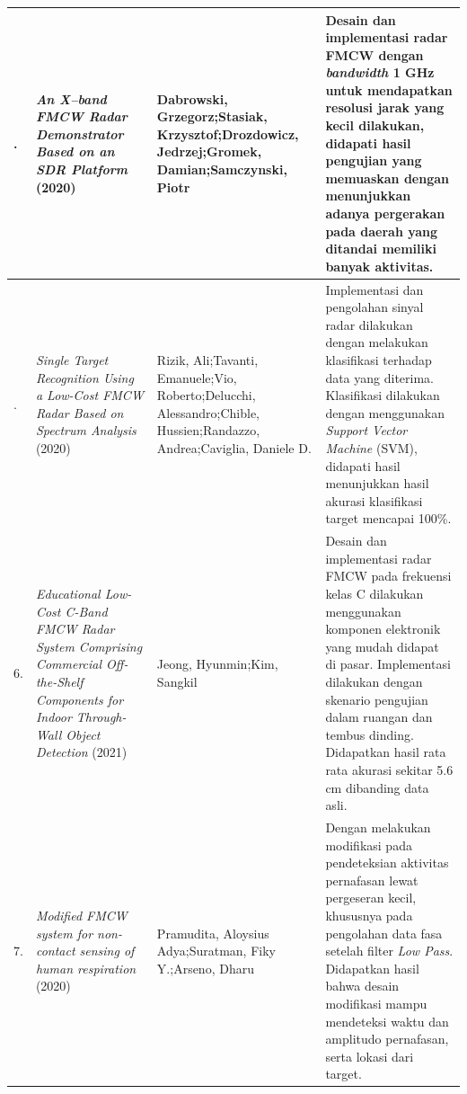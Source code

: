 \begin{center}
\begin{longtable}{|>{\centering\arraybackslash}p{0.6cm}|p{4cm}|p{4cm}|p{4cm}|}
	4. & \textit{An X–band FMCW Radar Demonstrator Based on an SDR Platform} (2020)
	& Dabrowski, Grzegorz;\newline Stasiak, Krzysztof;\newline Drozdowicz, Jedrzej;\newline Gromek, Damian;\newline Samczynski, Piotr
	& Desain dan implementasi radar FMCW dengan \textit{bandwidth} 1 GHz untuk mendapatkan resolusi jarak yang kecil dilakukan, didapati hasil pengujian yang memuaskan dengan menunjukkan adanya pergerakan pada daerah yang ditandai memiliki banyak aktivitas. \\ \hline
	
	5. & \textit{Single Target Recognition Using a Low-Cost FMCW Radar Based on Spectrum Analysis} (2020)
	& Rizik, Ali;\newline Tavanti, Emanuele;\newline Vio, Roberto;\newline Delucchi, Alessandro;\newline Chible, Hussien;\newline Randazzo, Andrea;\newline Caviglia, Daniele D.
	& Implementasi dan pengolahan sinyal radar dilakukan dengan melakukan klasifikasi terhadap data yang diterima. Klasifikasi dilakukan dengan menggunakan \textit{Support Vector Machine} (SVM), didapati hasil menunjukkan hasil akurasi klasifikasi target mencapai 100\%. \\ \hline
	
	6. & \textit{Educational Low-Cost C-Band FMCW Radar System Comprising Commercial Off-the-Shelf Components for Indoor Through-Wall Object Detection} (2021)
	& Jeong, Hyunmin;\newline Kim, Sangkil
	& Desain dan implementasi radar FMCW pada frekuensi kelas C dilakukan menggunakan komponen elektronik yang mudah didapat di pasar. Implementasi dilakukan dengan skenario pengujian dalam ruangan dan tembus dinding. Didapatkan hasil rata rata akurasi sekitar 5.6 cm dibanding data asli. \\ \hline
	
	7. & \textit{Modified FMCW system for non-contact sensing of human respiration} (2020)
	& Pramudita, Aloysius Adya;\newline Suratman, Fiky Y.;\newline Arseno, Dharu
	& Dengan melakukan modifikasi pada pendeteksian aktivitas pernafasan lewat pergeseran kecil, khususnya pada pengolahan data fasa setelah filter \textit{Low Pass}. Didapatkan hasil bahwa desain modifikasi mampu mendeteksi waktu dan amplitudo pernafasan, serta lokasi dari target. \\ \hline
	

\end{longtable}
\end{center}
